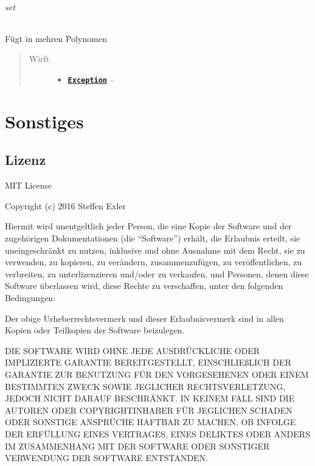 \documentclass[letterpaper,10pt,ngerman]{sphinxmanual}
\begin{document}
\subparagraph{set}
\label{com/linuxluigi/polynomial/test/PolynomialTest:set}

\begin{fulllineitems}
\label{com/linuxluigi/polynomial/test/PolynomialTest:com.linuxluigi.polynomial.test.PolynomialTest.set()}
Fügt in mehren Polynomen
\begin{quote}\begin{description}
\item[{Wirft}] \leavevmode\begin{itemize}
\item {} 
\href{http://docs.oracle.com/javase/8/docs/api/java/lang/Exception.html}{\textbf{\texttt{Exception}}} -- 

\end{itemize}

\end{description}\end{quote}

\end{fulllineitems}



\chapter{Sonstiges}
\label{index:sonstiges}

\section{Lizenz}
\label{license:lizenz}\label{license::doc}
MIT License

Copyright (c) 2016 Steffen Exler

Hiermit wird unentgeltlich jeder Person, die eine Kopie der Software und der zugehörigen Dokumentationen (die ``Software'') erhält, die Erlaubnis erteilt, sie uneingeschränkt zu nutzen, inklusive und ohne Ausnahme mit dem Recht, sie zu verwenden, zu kopieren, zu verändern, zusammenzufügen, zu veröffentlichen, zu verbreiten, zu unterlizenzieren und/oder zu verkaufen, und Personen, denen diese Software überlassen wird, diese Rechte zu verschaffen, unter den folgenden Bedingungen:

Der obige Urheberrechtsvermerk und dieser Erlaubnisvermerk sind in allen Kopien oder Teilkopien der Software beizulegen.

DIE SOFTWARE WIRD OHNE JEDE AUSDRÜCKLICHE ODER IMPLIZIERTE GARANTIE BEREITGESTELLT, EINSCHLIEßLICH DER GARANTIE ZUR BENUTZUNG FÜR DEN VORGESEHENEN ODER EINEM BESTIMMTEN ZWECK SOWIE JEGLICHER RECHTSVERLETZUNG, JEDOCH NICHT DARAUF BESCHRÄNKT. IN KEINEM FALL SIND DIE AUTOREN ODER COPYRIGHTINHABER FÜR JEGLICHEN SCHADEN ODER SONSTIGE ANSPRÜCHE HAFTBAR ZU MACHEN, OB INFOLGE DER ERFÜLLUNG EINES VERTRAGES, EINES DELIKTES ODER ANDERS IM ZUSAMMENHANG MIT DER SOFTWARE ODER SONSTIGER VERWENDUNG DER SOFTWARE ENTSTANDEN.
\end{document}
